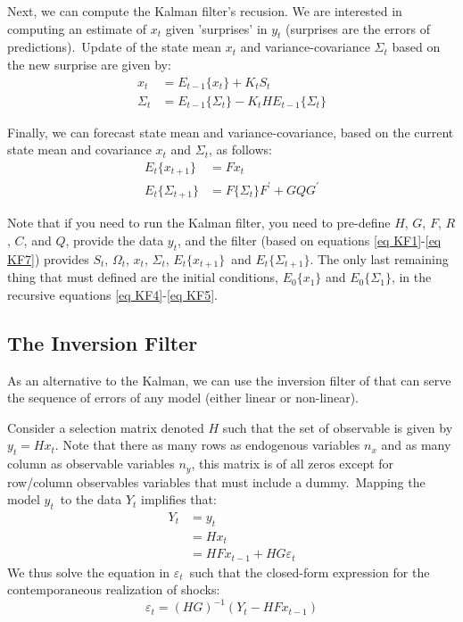 \documentclass[a4paper,12pt]{article}%
\begin{document}
Next, we can compute the Kalman filter's recusion. We are interested in
computing an estimate of $x_{t}$ given 'surprises' in $y_{t}$ (surprises are
the errors of predictions).\ Update of the state mean $x_{t}$ and
variance-covariance $\Sigma_{t}$ based on the new surprise are given by:
\begin{align}
x_{t}  &  =E_{t-1}\{x_{t}\}+K_{t}S_{t}\label{eq KF4}\\
\Sigma_{t}  &  =E_{t-1}\{\Sigma_{t}\}-K_{t}HE_{t-1}\{\Sigma_{t}\}
\label{eq KF5}%
\end{align}


Finally, we can forecast state mean and variance-covariance, based on the
current state mean and covariance $x_{t}$ and $\Sigma_{t}$, as follows:%
\begin{align}
E_{t}\{x_{t+1}\}  &  =Fx_{t}\label{eq KF6}\\
E_{t}\{\Sigma_{t+1}\}  &  =F\{\Sigma_{t}\}F^{\prime}+GQG^{\prime}
\label{eq KF7}%
\end{align}


Note that if you need to run the Kalman filter, you need to pre-define $H$,
$G$, $F$, $R$, $C$, and $Q$, provide the data $y_{t}$, and the filter (based
on equations \autoref{eq KF1}-\autoref{eq KF7}) provides $S_{t}$, $\Omega_{t}%
$, $x_{t}$, $\Sigma_{t}$, $E_{t}\{x_{t+1}\}$\ and $E_{t}\{\Sigma_{t+1}\}$. The
only last remaining thing that must defined are the initial conditions,
$E_{0}\{x_{1}\}$ and $E_{0}\{\Sigma_{1}\}$, in the recursive equations
\ref{eq KF4}-\ref{eq KF5}.

\subsection{The Inversion Filter}

As an alternative to the Kalman, we can use the inversion filter of
\cite{kollmann2013estimating} that can serve the sequence of errors of any
model (either linear or non-linear).

Consider a selection matrix denoted $H$ such that the set of observable is
given by $y_{t}=Hx_{t}$. Note that there as many rows as endogenous variables
$n_{x}$ and as many column as observable variables $n_{y}$, this matrix is of
all zeros except for row/column observables variables that must include a
dummy.\ Mapping the model $y_{t}$\ to the data $Y_{t}$ implifies that:%
\begin{align*}
Y_{t}  &  =y_{t}\\
&  =Hx_{t}\\
&  =HFx_{t-1}+HG\varepsilon_{t}%
\end{align*}
We thus solve the equation in $\varepsilon_{t}$\ such that the closed-form
expression for the contemporaneous realization of shocks:%
\begin{equation}
\varepsilon_{t}=\left(  HG\right)  ^{-1}\left(  Y_{t}-HFx_{t-1}\right)
\label{eq 4}%
\end{equation}
\end{document}
